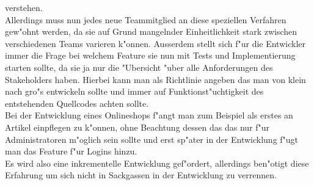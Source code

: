     verstehen.\\
    Allerdings muss nun jedes neue Teammitglied an diese speziellen Verfahren
    gew"ohnt werden, da sie auf Grund mangelnder Einheitlichkeit stark zwischen
    verschiedenen Teams varieren k"onnen.
    Ausserdem stellt sich f"ur die Entwickler immer die Frage bei welchem Feature
    sie nun mit Tests und Implementierung starten sollte, da sie ja nur die 
    "Ubersicht "uber alle Anforderungen des Stakeholders haben. Hierbei kann man
    als Richtlinie angeben das man von klein nach gro"s entwickeln sollte und 
    immer auf Funktionst"uchtigkeit des entstehenden Quellcodes achten sollte.\\
    Bei der Entwicklung eines Onlineshops f"angt man zum Beispiel als erstes 
    an Artikel einpflegen zu k"onnen, ohne Beachtung dessen das das nur f"ur
    Administratoren m"oglich sein sollte und erst sp"ater in der Entwicklung
    f"ugt man das Feature f"ur Logins hinzu.\\
    Es wird also eine inkrementelle Entwicklung gef"ordert, allerdings ben"otigt
    diese Erfahrung um sich nicht in Sackgassen in der Entwicklung zu verrennen.\\